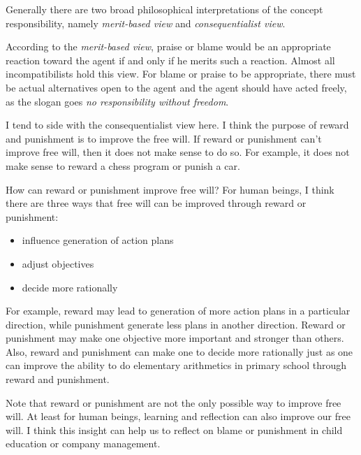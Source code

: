Generally there are two broad philosophical interpretations of the concept responsibility, namely \emph{merit-based view} and \emph{consequentialist view}.

According to the \emph{merit-based view}, praise or blame would be an appropriate reaction toward the agent if and only if he merits such a reaction. Almost all incompatibilists hold this view. For blame or praise to be appropriate, there must be actual alternatives open to the agent and the agent should have acted freely, as the slogan goes \emph{no responsibility without freedom}.

I tend to side with the consequentialist view here. I think the purpose of reward and punishment is to improve the free will. If reward or punishment can’t improve free will, then it does not make sense to do so. For example, it does not make sense to reward a chess program or punish a car.

How can reward or punishment improve free will? For human beings, I think there are three ways that free will can be improved through reward or punishment:

\begin{itemize}
\item influence generation of action plans
\item adjust objectives
\item decide more rationally
\end{itemize}

For example, reward may lead to generation of more action plans in a particular direction, while punishment generate less plans in another direction. Reward or punishment may make one objective more important and stronger than others. Also, reward and punishment can make one to decide more rationally just as one can improve the ability to do elementary arithmetics in primary school through reward and punishment.

Note that reward or punishment are not the only possible way to improve free will. At least for human beings, learning and reflection can also improve our free will. I think this insight  can help us to reflect on blame or punishment in child education or company management.
